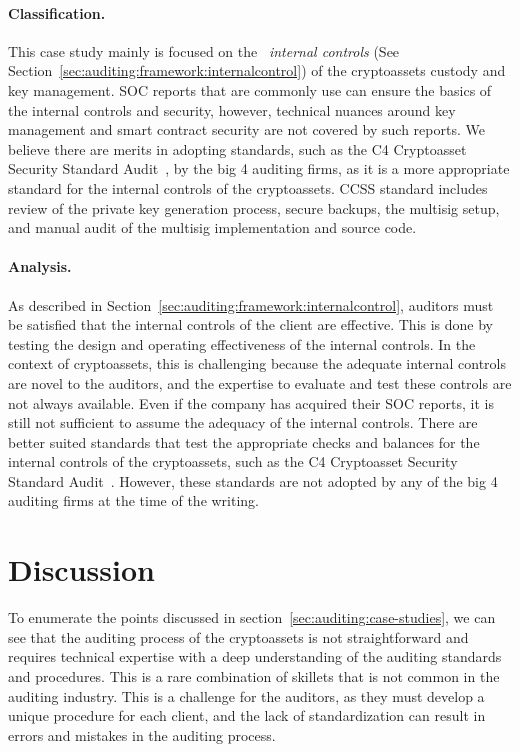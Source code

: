 \paragraph{Classification.} This case study mainly is focused on the ~\textit{internal controls} (See Section~\ref{sec:auditing:framework:internalcontrol}) of the cryptoassets custody and key management. SOC reports that are commonly use can ensure the basics of the internal controls and security, however, technical nuances around key management and smart contract security are not covered by such reports. We believe there are merits in adopting standards, such as the C4 Cryptoasset Security Standard Audit~\cite{c4ccssa}, by the big 4 auditing firms, as it is a more appropriate standard for the internal controls of the cryptoassets. CCSS standard includes review of the private key generation process, secure backups, the multisig setup, and manual audit of the multisig implementation and source code. 

\paragraph{Analysis.} As described in Section~\ref{sec:auditing:framework:internalcontrol}, auditors must be satisfied that the internal controls of the client are effective. This is done by testing the design and operating effectiveness of the internal controls. In the context of cryptoassets, this is challenging because the adequate internal controls are novel to the auditors, and the expertise to evaluate and test these controls are not always available. Even if the company has acquired their SOC reports, it is still not sufficient to assume the adequacy of the internal controls. There are better suited standards that test the appropriate checks and balances for the internal controls of the cryptoassets, such as the C4 Cryptoasset Security Standard Audit~\cite{c4ccssa}. However, these standards are not adopted by any of the big 4 auditing firms at the time of the writing. 


\section{Discussion} \label{sec:auditing:discussion}
To enumerate the points discussed in section~\ref{sec:auditing:case-studies}, we can see that the auditing process of the cryptoassets is not straightforward and requires technical expertise with a deep understanding of the auditing standards and procedures. This is a rare combination of skillets that is not common in the auditing industry. This is a challenge for the auditors, as they must develop a unique procedure for each client, and the lack of standardization can result in errors and mistakes in the auditing process.

